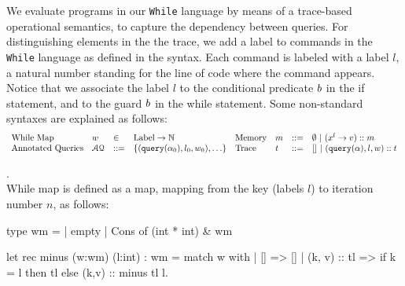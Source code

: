 \documentclass[a4paper,11pt]{article}
\begin{document}
{
We evaluate programs in our {\tt While} language by means of a trace-based operational semantics, to capture the dependency between queries. For distinguishing elements in the the trace, we add a label to commands in the {\tt While} language as defined in the syntax.
%
Each command is labeled with a label $l$, a natural number standing for the line of code where the command appears. Notice that we associate the label $l$ to the conditional predicate $b$ in the if statement, and to the guard $b$ in the while statement. Some non-standard syntaxes are explained as follows:  
%
\[
	\begin{array}{llll}
		\mbox{While Map} 
		& w & \in & \mbox{Label} \to \mathbb{N} \\
		\mbox{Annotated Queries} 
		& \mathcal{AQ}  & ::= & 
		{\left\{( \query(\qval_0), l_0, w_0), \ldots \right\} }  \\
	\end{array}
	\begin{array}{llll}
		\mbox{Memory} 
		& m & ::= & \emptyset ~|~ (x^{l} \to v) :: m  \\
		\mbox{Trace} 
		& t & ::= & [] ~|~ ( \query(\qval), l, w) :: t \\
	\end{array}
\]
  	\begin{defn}.
  	\\
  	While map is defined as a map, mapping from the key (labels $l$) to iteration number $n$, as follows:
	\begin{ocaml}{}
	type wm = | empty 
	          | Cons of (int * int) & wm

	let rec  minus (w:wm) (l:int) : wm = 
	    match w with 
	       | [] => []
	       | (k, v) :: tl => 
	        if k = l then tl else (k,v) :: minus tl l.   


\end{ocaml}
\end{defn}}
\end{document}
